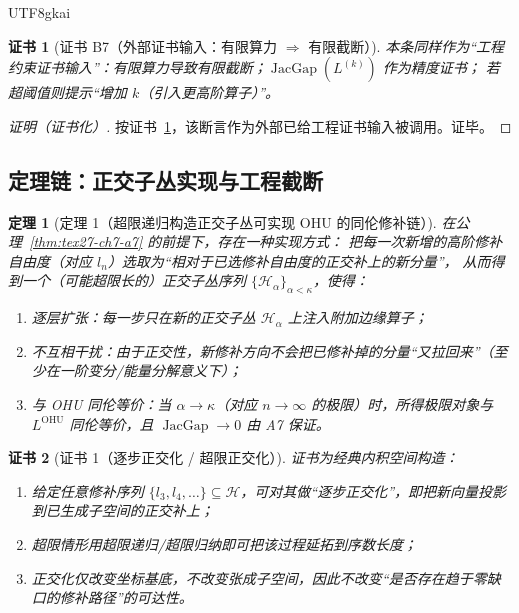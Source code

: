 \documentclass[12pt]{article}
\newtheorem{theorem}{定理}[section]
\newtheorem{Certificate}{证书}[section]
\newcommand{\JacGap}{\operatorname{JacGap}}
\begin{document}
\begin{CJK*}{UTF8}{gkai}
\begin{Certificate}[证书 B7（外部证书输入：有限算力 $\Rightarrow$ 有限截断）]
\label{cert:tex27-ch7-b7}
本条同样作为“工程约束证书输入”：有限算力导致有限截断；$\JacGap(L^{(k)})$ 作为精度证书；
若超阈值则提示“增加 $k$（引入更高阶算子）”。
\cite{GaoZheng2025GFramework}
\end{Certificate}

\begin{proof}[证明（证书化）]
按证书~\ref{cert:tex27-ch7-b7}，该断言作为外部已给工程证书输入被调用。证毕。
\end{proof}

\subsection{定理链：正交子丛实现与工程截断}
\label{subsec:tex27-ch7-theorems}

\begin{theorem}[定理 1（超限递归构造正交子丛可实现 OHU 的同伦修补链）]
\label{thm:tex27-ch7-thm1}
在公理~\ref{thm:tex27-ch7-a7} 的前提下，存在一种实现方式：
把每一次新增的高阶修补自由度（对应 $l_n$）选取为“相对于已选修补自由度的正交补上的新分量”，
从而得到一个（可能超限长的）正交子丛序列 $\{\mathcal{H}_\alpha\}_{\alpha<\kappa}$，使得：
\begin{enumerate}
  \item 逐层扩张：每一步只在新的正交子丛 $\mathcal{H}_\alpha$ 上注入附加边缘算子；
  \item 不互相干扰：由于正交性，新修补方向不会把已修补掉的分量“又拉回来”（至少在一阶变分/能量分解意义下）；
  \item 与 OHU 同伦等价：当 $\alpha\to\kappa$（对应 $n\to\infty$ 的极限）时，所得极限对象与 $L^{\mathrm{OHU}}$ 同伦等价，且 $\JacGap\to 0$ 由 A7 保证。
\end{enumerate}
\end{theorem}

\begin{Certificate}[证书 1（逐步正交化 / 超限正交化）]
\label{cert:tex27-ch7-thm1}
证书为经典内积空间构造：
\begin{enumerate}
  \item 给定任意修补序列 $\{l_3,l_4,\dots\}\subseteq\mathcal{H}$，可对其做“逐步正交化”，即把新向量投影到已生成子空间的正交补上；
  \item 超限情形用超限递归/超限归纳即可把该过程延拓到序数长度；
  \item 正交化仅改变坐标基底，不改变张成子空间，因此不改变“是否存在趋于零缺口的修补路径”的可达性。
\end{enumerate}
\end{Certificate}


\end{CJK*}
\end{document}
